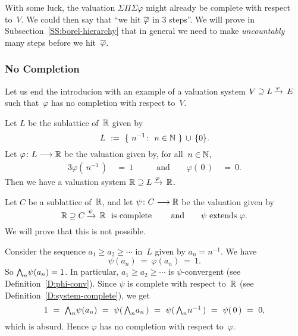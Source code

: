 \documentclass[main.tex]{subfiles}
\begin{document}
With some luck, the valuation $\Sigma\Pi\Sigma \varphi$
might already be complete with respect to~$V$.
We could then say that ``we hit $\overline\varphi$ in $3$ steps''.
We will prove in Subsection~\ref{SS:borel-hierarchy}
that in general
we need to make \emph{uncountably} many steps
before we hit~$\overline\varphi$. {}


\subsubsection*{No Completion}
Let us end the introducion
with an example
of a valuation
system $V \supseteq L\,\smash{\xrightarrow{\varphi}\,E}$
such that~$\varphi$ has no completion with respect to~$V$.
\begin{ex}
\label{E:no-completion}
Let $L$ be the sublattice of~$\mathbb{R}$ given by
\begin{equation*}
L\ :=\ \{ \ n^{-1}\colon\ n\in\mathbb{N}\ \} \,\cup\, \{0\}.
\end{equation*}
Let $\varphi\colon L \longrightarrow \mathbb{R}$
be the valuation given by, for all~$n\in\mathbb{N}$,
\begin{alignat*}{3}
\varphi(\,n^{-1}\,) \ &=\ 1&\qquad\text{and}\qquad
\varphi(\,0\,) \ &=\ 0.
\end{alignat*}
Then we have a valuation system $\mathbb{R} \supseteq L\,\smash{\xrightarrow{\varphi}\,\mathbb{R}}$.

Let $C$ be a sublattice of~$\mathbb{R}$,
and let $\psi\colon C \longrightarrow \mathbb{R}$
be the valuation given by
\begin{equation*}
\vs{\R}{C}\psi\R\text{ \ is complete }
\qquad\text{and}\qquad
\psi\text{ extends }\varphi.
\end{equation*}
We will prove that this is not possible.

Consider the sequence $a_1 \geq a_2 \geq \dotsb$ in~$L$
given by $a_n = n^{-1}$.
We have 
\begin{equation*}
\psi(a_n) \ =\  \varphi(a_n) \ =\  1.
\end{equation*}
So $\textstyle{\bigwedge}_n \psi(a_n) = 1$.
In particular,
$a_1 \geq a_2 \geq \dotsb$ is $\psi$-convergent
(see Definition~\ref{D:phi-conv}).
Since $\psi$ is complete with respect to~$\mathbb{R}$
(see Definition~\ref{D:system-complete}), 
we get
\begin{equation*}
1\ = \ 
\bw_n \psi( a_n ) \ = \  \psi(\, \bw_n a_n \,)
\ =\ \psi(\,\bw_n n^{-1}\,)
\ =\ \psi(\, 0\, ) \ =\  0,
\end{equation*}
which is absurd.
Hence $\varphi$ has no completion with respect to~$\varphi$.

\end{ex}
\end{document}
